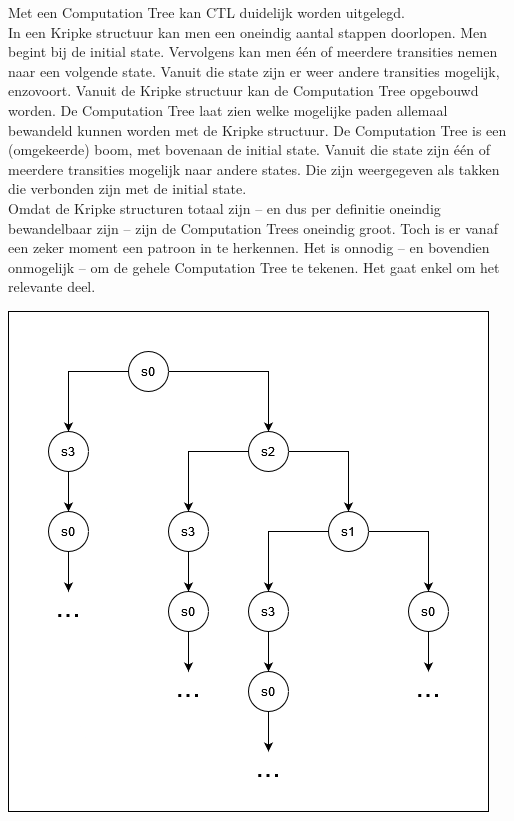 \documentclass{article}
\begin{document}
		Met een Computation Tree kan CTL duidelijk worden uitgelegd. \\
		In een Kripke structuur kan men een oneindig aantal stappen doorlopen. Men begint bij de initial state. Vervolgens kan men één of meerdere transities nemen naar een volgende state. Vanuit die state zijn er weer andere transities mogelijk, enzovoort. Vanuit de Kripke structuur kan de Computation Tree opgebouwd worden. De Computation Tree laat zien welke mogelijke paden allemaal bewandeld kunnen worden met de Kripke structuur. De Computation Tree is een (omgekeerde) boom, met bovenaan de initial state. Vanuit die state zijn één of meerdere transities mogelijk naar andere states. Die zijn weergegeven als takken die verbonden zijn met de initial state. \\		
		Omdat de Kripke structuren totaal zijn -- en dus per definitie oneindig bewandelbaar zijn -- zijn de Computation Trees oneindig groot. Toch is er vanaf een zeker moment een patroon in te herkennen. Het is onnodig -- en bovendien onmogelijk -- om de gehele Computation Tree te tekenen. Het gaat enkel om het relevante deel.

		\begin{center}
			\begin{minipage}{0.8\textwidth}
				\includegraphics[width=\textwidth]{computation-tree-stoplicht.png}
			\end{minipage}
			\hfill
		\end{center}
\end{document}
